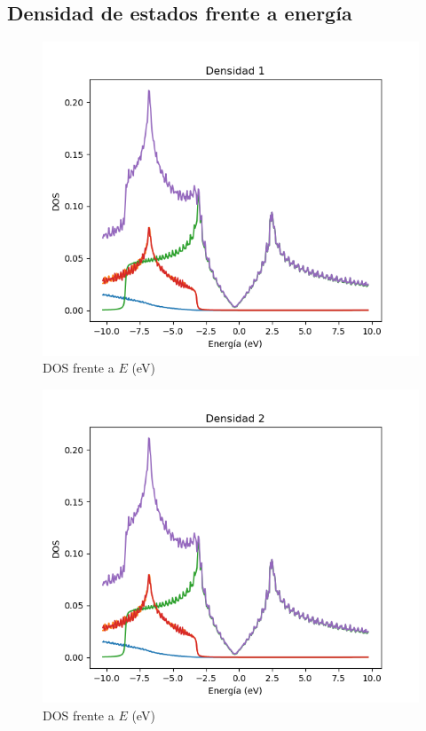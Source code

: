 \subsection{Densidad de estados frente a energía}
\begin{figure}[!h]
    \centering
    \includegraphics[scale=.6]{FIGURAS/Densidad_1.png}
    \caption{DOS frente a $E$ (eV)}
    \label{fig:enter-label}
\end{figure}
\begin{figure}[!h]
    \centering
    \includegraphics[scale=.6]{FIGURAS/Densidad_2.png}
    \caption{DOS frente a $E$ (eV)}
    \label{fig:enter-label2}
\end{figure}
